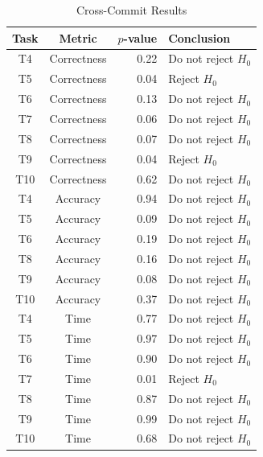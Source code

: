 \begin{table}[htpb]
  \centering
  \caption{Cross-Commit Results}
  \label{tab:cross_commit_results}
  \begin{tabular}{ccrl}
    \toprule
    Task & Metric      & $p$-value & Conclusion\\\midrule
    T4   & Correctness & 0.22      & Do not reject $H_0$\\
    T5   & Correctness & 0.04      & Reject $H_0$\\
    T6   & Correctness & 0.13      & Do not reject $H_0$\\
    T7   & Correctness & 0.06      & Do not reject $H_0$\\
    T8   & Correctness & 0.07      & Do not reject $H_0$\\
    T9   & Correctness & 0.04      & Reject $H_0$\\
    T10  & Correctness & 0.62      & Do not reject $H_0$\\

    T4  & Accuracy & 0.94 & Do not reject $H_0$\\
    T5  & Accuracy & 0.09 & Do not reject $H_0$\\
    T6  & Accuracy & 0.19 & Do not reject $H_0$\\
    T8  & Accuracy & 0.16 & Do not reject $H_0$\\
    T9  & Accuracy & 0.08 & Do not reject $H_0$\\
    T10 & Accuracy & 0.37 & Do not reject $H_0$\\

    T4  & Time & 0.77 & Do not reject $H_0$\\
    T5  & Time & 0.97 & Do not reject $H_0$\\
    T6  & Time & 0.90 & Do not reject $H_0$\\
    T7  & Time & 0.01 & Reject $H_0$\\
    T8  & Time & 0.87 & Do not reject $H_0$\\
    T9  & Time & 0.99 & Do not reject $H_0$\\
    T10 & Time & 0.68 & Do not reject $H_0$\\
    \bottomrule
  \end{tabular}
\end{table}


